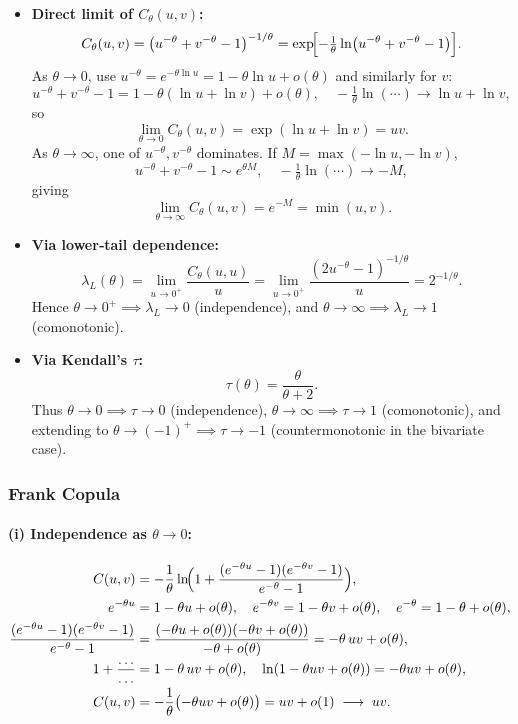 \documentclass[11pt]{article}
\begin{document}
\begin{itemize}
  \item \textbf{Direct limit of \(C_\theta(u,v)\):}
    \[
      C_\theta(u,v)
      =\bigl(u^{-\theta}+v^{-\theta}-1\bigr)^{-1/\theta}
      =\exp\!\Bigl[-\tfrac1\theta\ln\bigl(u^{-\theta}+v^{-\theta}-1\bigr)\Bigr].
    \]
    As \(\theta\to0\), use \(u^{-\theta}=e^{-\theta\ln u}=1-\theta\ln u+o(\theta)\) and similarly for \(v\):
    \[
      u^{-\theta}+v^{-\theta}-1
      =1-\theta(\ln u+\ln v)+o(\theta),
      \quad
      -\tfrac1\theta\ln(\cdots)\to\ln u+\ln v,
    \]
    so
    \[
      \lim_{\theta\to0}C_\theta(u,v)
      =\exp(\ln u+\ln v)=uv.
    \]
    As \(\theta\to\infty\), one of \(u^{-\theta},v^{-\theta}\) dominates. If \(M=\max(-\ln u,-\ln v)\),
    \[
      u^{-\theta}+v^{-\theta}-1\sim e^{\theta M},
      \quad
      -\tfrac1\theta\ln(\cdots)\to -M,
    \]
    giving
    \[
      \lim_{\theta\to\infty}C_\theta(u,v)
      =e^{-M}=\min(u,v).
    \]

  \item \textbf{Via lower‐tail dependence:}
    \[
      \lambda_L(\theta)
      =\lim_{u\to0^+}\frac{C_\theta(u,u)}u
      =\lim_{u\to0^+}\frac{(2u^{-\theta}-1)^{-1/\theta}}u
      =2^{-1/\theta}.
    \]
    Hence \(\theta\to0^+\implies\lambda_L\to0\) (independence), and \(\theta\to\infty\implies\lambda_L\to1\) (comonotonic).

  \item \textbf{Via Kendall’s \(\tau\):}
    \[
      \tau(\theta)=\frac{\theta}{\theta+2}.
    \]
    Thus \(\theta\to0\implies\tau\to0\) (independence), \(\theta\to\infty\implies\tau\to1\) (comonotonic), and extending to \(\theta\to(-1)^+\implies\tau\to-1\) (countermonotonic in the bivariate case).
\end{itemize}

\subsubsection{Frank Copula}
\paragraph{(i) Independence as \(\theta\to0\):}
\begin{align*}
C(u,v)
&=-\frac1\theta\ln\!\Bigl(
1+\frac{(e^{-\theta u}-1)(e^{-\theta v}-1)}{e^{-\theta}-1}
\Bigr),\\
e^{-\theta u}&=1-\theta u+o(\theta),\quad
e^{-\theta v}=1-\theta v+o(\theta),\quad
e^{-\theta}=1-\theta+o(\theta),\\
\frac{(e^{-\theta u}-1)(e^{-\theta v}-1)}{e^{-\theta}-1}
&=\frac{(-\theta u+o(\theta))(-\theta v+o(\theta))}{-\theta+o(\theta)}
=-\theta\,uv+o(\theta),\\
1+\frac{\dots}{\dots}&=1-\theta\,uv+o(\theta),\quad
\ln(1-\theta uv+o(\theta))=-\theta uv+o(\theta),\\
C(u,v)&=-\frac1\theta\bigl(-\theta uv+o(\theta)\bigr)
=uv+o(1)\;\longrightarrow\;uv.
\end{align*}
\end{document}

